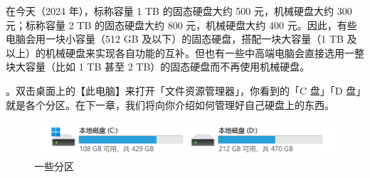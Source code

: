 在今天（2024 年），标称容量 1 TB 的固态硬盘大约 500 元，机械硬盘大约 300 元；标称容量 2 TB 的固态硬盘大约 800 元，机械硬盘大约 400 元。因此，有些电脑会用一块小容量（512 GB 及以下）的固态硬盘，搭配一块大容量（1 TB 及以上）的机械硬盘来实现各自功能的互补。但也有一些中高端电脑会直接选用一整块大容量（比如 1 TB 甚至 2 TB）的固态硬盘而不再使用机械硬盘。

。双击桌面上的【此电脑】来打开「文件资源管理器」，你看到的「C 盘」「D 盘」就是各个分区。在下一章，我们将向你介绍如何管理好自己硬盘上的东西。 

\begin{figure}[htb!]
  \centering
  \includegraphics[width=.8\textwidth]{assets/basic/Partitions.png}
  \caption{一些分区}
  \label{fig:partitions}
\end{figure}

